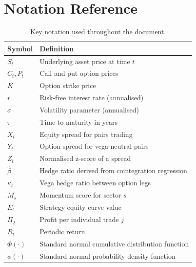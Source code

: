 \chapter{Notation Reference}
\label{chap:notation}

\begin{table}[h]
    \centering
    \begin{tabular}{ll}
        \toprule
        Symbol & Definition \\
        \midrule
        $S_t$ & Underlying asset price at time $t$ \\
        $C_t, P_t$ & Call and put option prices \\
        $K$ & Option strike price \\
        $r$ & Risk-free interest rate (annualised) \\
        $\sigma$ & Volatility parameter (annualised) \\
        $\tau$ & Time-to-maturity in years \\
        $X_t$ & Equity spread for pairs trading \\
        $Y_t$ & Option spread for vega-neutral pairs \\
        $Z_t$ & Normalised z-score of a spread \\
        $\hat{\beta}$ & Hedge ratio derived from cointegration regression \\
        $\kappa_t$ & Vega hedge ratio between option legs \\
        $M_s$ & Momentum score for sector $s$ \\
        $E_t$ & Strategy equity curve value \\
        $\Pi_j$ & Profit per individual trade $j$ \\
        $R_t$ & Periodic return \\
        $\Phi(\cdot)$ & Standard normal cumulative distribution function \\
        $\phi(\cdot)$ & Standard normal probability density function \\
        \bottomrule
    \end{tabular}
    \caption{Key notation used throughout the document.}
\end{table}
